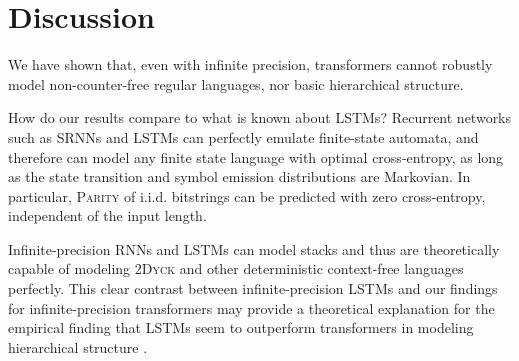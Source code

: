 \documentclass[11pt,a4paper]{article}
\begin{document}




\section{Discussion}\label{sec:discussion}

We have shown that, even with infinite precision, transformers cannot robustly model non-counter-free regular languages, nor basic hierarchical structure.

How do our results compare to what is known about LSTMs?
Recurrent networks such as SRNNs and LSTMs can perfectly emulate finite-state automata, and therefore can model any finite state language with optimal cross-entropy, as long as the state transition and symbol emission distributions are Markovian.
In particular, \textsc{Parity} of i.i.d. bitstrings can be predicted with zero cross-entropy, independent of the input length.

Infinite-precision RNNs and LSTMs can model stacks \cite{tabor2000fractal,gruning2006stack,kirov2012processing} and thus are theoretically capable of modeling \textsc{2Dyck} and other deterministic context-free languages perfectly. %
This clear contrast between infinite-precision LSTMs and our findings for infinite-precision transformers may provide a theoretical explanation for the empirical finding that LSTMs seem to outperform transformers in modeling hierarchical structure \citep{tran2018importance}.





\end{document}
